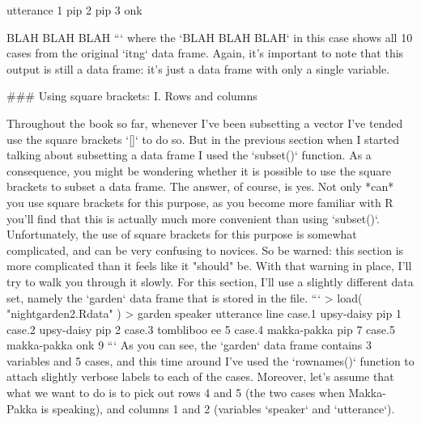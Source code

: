    utterance
1        pip
2        pip
3        onk

BLAH BLAH BLAH
```
where the `BLAH BLAH BLAH` in this case shows all 10 cases from the original `itng` data frame. Again, it's important to note that this output is still a data frame: it's just a data frame with only a single variable. 



### Using square brackets: I. Rows and columns

Throughout the book so far, whenever I've been subsetting a vector I've tended use the square brackets `[]` to do so. But in the previous section when I started talking about subsetting a data frame I used the `subset()` function. As a consequence, you might be wondering whether it is possible to use the square brackets to subset a data frame. The answer, of course, is yes. Not only *can* you use square brackets for this purpose, as you become more familiar with R you'll find that this is actually much more convenient than using `subset()`. Unfortunately, the use of square brackets for this purpose is somewhat complicated, and can be very confusing to novices. So be warned: this section is more complicated than it feels like it "should" be. With that warning in place, I'll try to walk you through it slowly. For this section, I'll use a slightly different data set, namely the `garden` data frame that is stored in the  file. 
```
> load( "nightgarden2.Rdata" )
> garden
           speaker utterance line
case.1  upsy-daisy       pip    1
case.2  upsy-daisy       pip    2
case.3   tombliboo        ee    5
case.4 makka-pakka       pip    7
case.5 makka-pakka       onk    9
``` 
As you can see, the `garden` data frame contains 3 variables and 5 cases, and this time around I've used the `rownames()` function to attach slightly verbose labels to each of the cases. Moreover, let's assume that what we want to do is to pick out rows 4 and 5 (the two cases when Makka-Pakka is speaking), and columns 1 and 2 (variables `speaker` and `utterance`).

